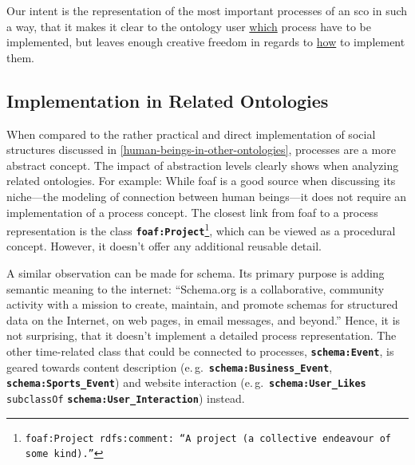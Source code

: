 \documentclass[a4paper, DIV=13, BCOR=0cm]{scrbook}
\newcommand{\eg}{e.\,g.\ }
\newcommand{\class}[1]{\texttt{\textbf{#1}}}
\newcommand{\relation}[1]{\texttt{#1}}
\newcommand{\foottt}[1]{\footnote{\texttt{#1}}}
\begin{document}
Our intent is the representation of the most important processes of an \gls{sco} in such a way, that it makes it clear to the ontology user \underline{which} process have to be implemented, but leaves enough creative freedom in regards to \underline{how} to implement them.

\subsection{Implementation in Related Ontologies}
When compared to the rather practical and direct implementation of social structures discussed in \autoref{human-beings-in-other-ontologies}, processes are a more abstract concept. The impact of abstraction levels clearly shows when analyzing related ontologies. For example: While \gls{foaf} is a good source when discussing its niche---the modeling of connection between human beings---it does not require an implementation of a process concept. The closest link from \gls{foaf} to a process representation is the  class \class{foaf:Project}\foottt{foaf:Project rdfs:comment: \enquote{A project (a collective endeavour of some kind).}}, which can be viewed as a procedural concept. However, it doesn't offer any additional reusable detail.

A similar observation can be made for \gls{schema}. Its primary purpose is adding semantic meaning to the internet: \enquote{Schema.org is a collaborative, community activity with a mission to create, maintain, and promote schemas for structured data on the Internet, on web pages, in email messages, and beyond.} \cite{schema-mission} Hence, it is not surprising, that it doesn't implement a detailed process representation. The other time-related class that could be connected to processes, \class{schema:Event}, is geared towards content description (\eg \class{schema:Business\_Event}, \class{schema:Sports\_Event}) and website interaction (\eg \class{schema:User\_Likes} \relation{subclassOf} \class{schema:User\_Interaction}) instead.
\end{document}
